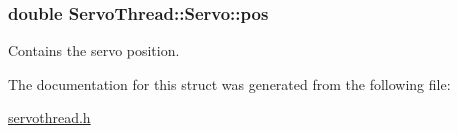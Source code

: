 \hypertarget{a00007_a9fa0aa56944b9b0bb9d66303d5bd4b59}{}
\subsubsection[{pos}]{\setlength{\rightskip}{0pt plus 5cm}double Servo\+Thread\+::\+Servo\+::pos}\label{a00007_a9fa0aa56944b9b0bb9d66303d5bd4b59}


Contains the servo position. 



The documentation for this struct was generated from the following file\+:\begin{DoxyCompactItemize}
\item 
\hyperlink{a00024}{servothread.\+h}\end{DoxyCompactItemize}
